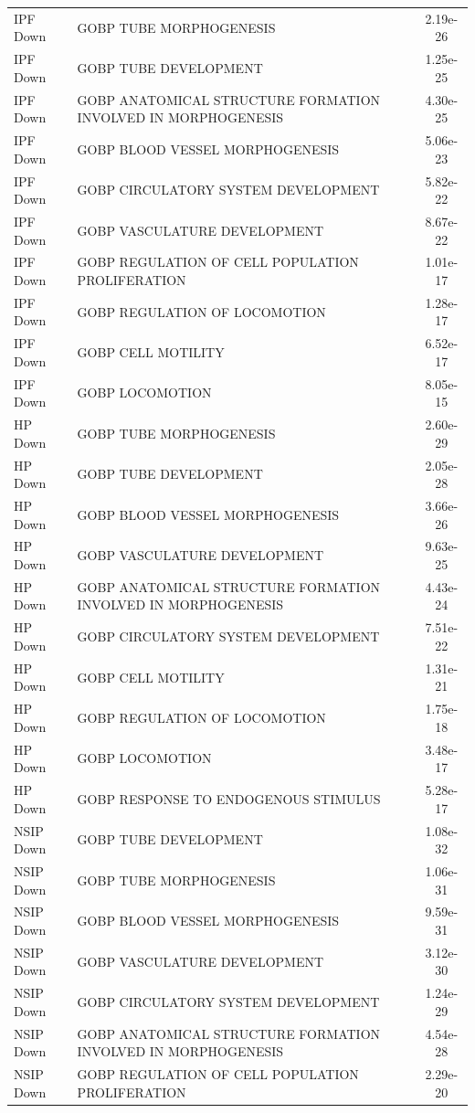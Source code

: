 \documentclass[
]{article}
\begin{document}
\begin{singlespace}
\begin{longtable}[t]{>{\raggedright\arraybackslash}p{1.0in}>{\raggedright\arraybackslash}p{4.5in}c}
\endfoot
\bottomrule
\endlastfoot
IPF Down & GOBP TUBE MORPHOGENESIS & 2.19e-26\\
IPF Down & GOBP TUBE DEVELOPMENT & 1.25e-25\\
IPF Down & GOBP ANATOMICAL STRUCTURE FORMATION INVOLVED IN MORPHOGENESIS & 4.30e-25\\
IPF Down & GOBP BLOOD VESSEL MORPHOGENESIS & 5.06e-23\\
IPF Down & GOBP CIRCULATORY SYSTEM DEVELOPMENT & 5.82e-22\\
\addlinespace
IPF Down & GOBP VASCULATURE DEVELOPMENT & 8.67e-22\\
IPF Down & GOBP REGULATION OF CELL POPULATION PROLIFERATION & 1.01e-17\\
IPF Down & GOBP REGULATION OF LOCOMOTION & 1.28e-17\\
IPF Down & GOBP CELL MOTILITY & 6.52e-17\\
IPF Down & GOBP LOCOMOTION & 8.05e-15\\
\addlinespace
HP Down & GOBP TUBE MORPHOGENESIS & 2.60e-29\\
HP Down & GOBP TUBE DEVELOPMENT & 2.05e-28\\
HP Down & GOBP BLOOD VESSEL MORPHOGENESIS & 3.66e-26\\
HP Down & GOBP VASCULATURE DEVELOPMENT & 9.63e-25\\
HP Down & GOBP ANATOMICAL STRUCTURE FORMATION INVOLVED IN MORPHOGENESIS & 4.43e-24\\
\addlinespace
HP Down & GOBP CIRCULATORY SYSTEM DEVELOPMENT & 7.51e-22\\
HP Down & GOBP CELL MOTILITY & 1.31e-21\\
HP Down & GOBP REGULATION OF LOCOMOTION & 1.75e-18\\
HP Down & GOBP LOCOMOTION & 3.48e-17\\
HP Down & GOBP RESPONSE TO ENDOGENOUS STIMULUS & 5.28e-17\\
\addlinespace
NSIP Down & GOBP TUBE DEVELOPMENT & 1.08e-32\\
NSIP Down & GOBP TUBE MORPHOGENESIS & 1.06e-31\\
NSIP Down & GOBP BLOOD VESSEL MORPHOGENESIS & 9.59e-31\\
NSIP Down & GOBP VASCULATURE DEVELOPMENT & 3.12e-30\\
NSIP Down & GOBP CIRCULATORY SYSTEM DEVELOPMENT & 1.24e-29\\
\addlinespace
NSIP Down & GOBP ANATOMICAL STRUCTURE FORMATION INVOLVED IN MORPHOGENESIS & 4.54e-28\\
NSIP Down & GOBP REGULATION OF CELL POPULATION PROLIFERATION & 2.29e-20\\

\end{longtable}
\end{singlespace}
\end{document}
